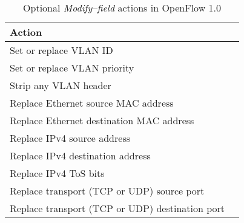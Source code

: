 \begin{table}
\begin{tabular}{|l|l|}
\hline \textbf{Action} \\
\hline Set or replace VLAN ID \\
\hline Set or replace VLAN priority \\
\hline Strip any VLAN header \\
\hline Replace Ethernet source MAC address \\
\hline Replace Ethernet destination MAC address \\
\hline Replace IPv4 source address \\
\hline Replace IPv4 destination address \\
\hline Replace IPv4 \ac{ToS} bits \\
\hline Replace transport (TCP or UDP) source port \\
\hline Replace transport (TCP or UDP) destination port \\
\hline
\end{tabular}
\caption{Optional {\em Modify--field} actions in OpenFlow 1.0}
\label{table:openflow-1.0.mods}
\end{table}

